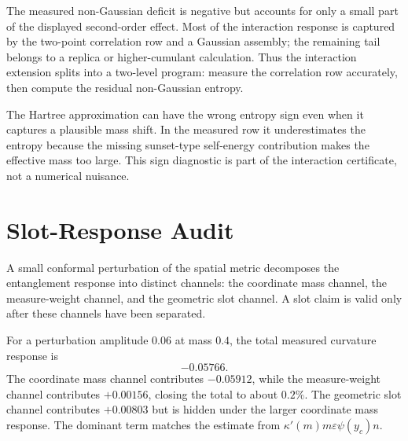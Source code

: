 \begin{principle}
\label{prin:innovation-input-interaction-two-level-program}
The measured non-Gaussian deficit is negative but accounts for only a small
part of the displayed second-order effect. Most of the interaction response
is captured by the two-point correlation row and a Gaussian assembly; the
remaining tail belongs to a replica or higher-cumulant calculation. Thus
the interaction extension splits into a two-level program: measure the
correlation row accurately, then compute the residual non-Gaussian entropy.
\end{principle}

\begin{principle}
\label{prin:innovation-input-interaction-hartree-sign-diagnostic}
The Hartree approximation can have the wrong entropy sign even when it
captures a plausible mass shift. In the measured row it underestimates the
entropy because the missing sunset-type self-energy contribution makes the
effective mass too large. This sign diagnostic is part of the interaction
certificate, not a numerical nuisance.
\end{principle}

\section{Slot-Response Audit}
\label{sec:innovation-input-slot-response-audit}

\begin{definition}
\label{def:innovation-input-conformal-response-channels}
A small conformal perturbation of the spatial metric decomposes the
entanglement response into distinct channels: the coordinate mass channel,
the measure-weight channel, and the geometric slot channel. A slot claim is
valid only after these channels have been separated.
\end{definition}

\begin{principle}
\label{prin:innovation-input-slot-channel-decomposition-witness}
For a perturbation amplitude $0.06$ at mass $0.4$, the total measured
curvature response is
$$
-0.05766.
$$
The coordinate mass channel contributes $-0.05912$, while the
measure-weight channel contributes $+0.00156$, closing the total to about
$0.2\%$. The geometric slot channel contributes $+0.00803$ but is hidden
under the larger coordinate mass response. The dominant term matches the
estimate from $\kappa'(m)m\varepsilon\psi(y_c)n$.
\end{principle}

